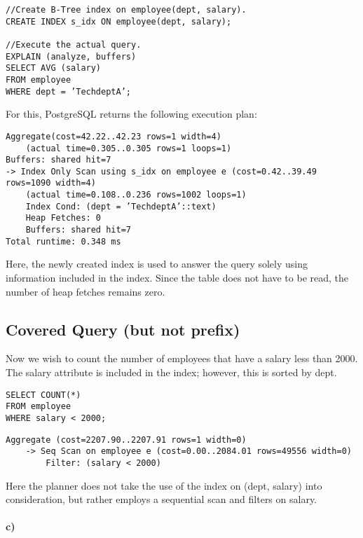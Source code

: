 \documentclass[11pt]{scrartcl}
\begin{document}
\begin{lstlisting}[style=dbtsql]
//Create B-Tree index on employee(dept, salary).
CREATE INDEX s_idx ON employee(dept, salary);

//Execute the actual query.
EXPLAIN (analyze, buffers)
SELECT AVG (salary)
FROM employee
WHERE dept = ’TechdeptA’;
\end{lstlisting}

For this, PostgreSQL returns the following execution plan:

\begin{lstlisting}
Aggregate(cost=42.22..42.23 rows=1 width=4)
    (actual time=0.305..0.305 rows=1 loops=1)
Buffers: shared hit=7
-> Index Only Scan using s_idx on employee e (cost=0.42..39.49 rows=1090 width=4)
    (actual time=0.108..0.236 rows=1002 loops=1)
    Index Cond: (dept = ’TechdeptA’::text)
    Heap Fetches: 0
    Buffers: shared hit=7
Total runtime: 0.348 ms
\end{lstlisting}

Here, the newly created index is used to answer the query solely using information included in the index.  Since the table does not have to be read, the number of heap fetches remains zero.

\subsection{Covered Query (but not prefix)}

Now we wish to count the number of employees that have a salary less than 2000. The salary attribute is included in the index; however, this is sorted by dept.

\begin{lstlisting}[style=dbtsql]
SELECT COUNT(*)
FROM employee
WHERE salary < 2000;
\end{lstlisting}

\begin{lstlisting}
Aggregate (cost=2207.90..2207.91 rows=1 width=0)
    -> Seq Scan on employee e (cost=0.00..2084.01 rows=49556 width=0)
        Filter: (salary < 2000)
\end{lstlisting}

Here the planner does not take the use of the index on (dept, salary) into consideration, but rather employs a sequential scan and filters on salary.

\paragraph{c)}
\end{document}
